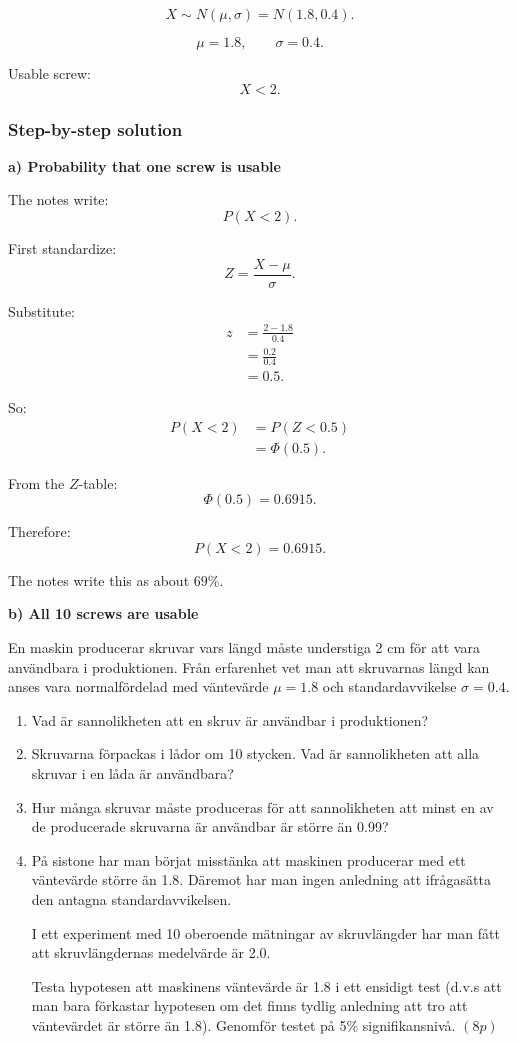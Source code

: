 \documentclass[10pt]{article}
\begin{document}
\[
X\sim N(\mu,\sigma)
=N(1.8,0.4).
\]

\[
\mu=1.8,
\qquad
\sigma=0.4.
\]

Usable screw:
\[
X<2.
\]

\subsubsection*{Step-by-step solution}

\textbf{a) Probability that one screw is usable}

The notes write:
\[
P(X<2).
\]

First standardize:
\[
Z=\frac{X-\mu}{\sigma}.
\]

Substitute:
\begin{align*}
z
&=
\frac{2-1.8}{0.4}
\\[2mm]
&=
\frac{0.2}{0.4}
\\[2mm]
&=0.5.
\end{align*}

So:
\begin{align*}
P(X<2)
&=
P(Z<0.5)
\\[2mm]
&=
\Phi(0.5).
\end{align*}

From the \(Z\)-table:
\[
\Phi(0.5)=0.6915.
\]

Therefore:
\[
P(X<2)=0.6915.
\]

The notes write this as about \(69\%\).

\textbf{b) All 10 screws are usable}

En maskin producerar skruvar vars längd måste
understiga 2 cm för att vara användbara i
produktionen. Från erfarenhet vet man att skruvarnas
längd kan anses vara normalfördelad med väntevärde
\(\mu=1.8\) och standardavvikelse \(\sigma=0.4\).

\begin{enumerate}[label=\alph*)]
\item Vad är sannolikheten att en skruv är användbar
i produktionen?

\item Skruvarna förpackas i lådor om 10 stycken.
Vad är sannolikheten att alla skruvar i en låda är
användbara?

\item Hur många skruvar måste produceras för att
sannolikheten att minst en av de producerade
skruvarna är användbar är större än 0.99?

\item På sistone har man börjat misstänka att
maskinen producerar med ett väntevärde större än
1.8. Däremot har man ingen anledning att ifrågasätta
den antagna standardavvikelsen.

I ett experiment med 10 oberoende mätningar av
skruvlängder har man fått att skruvlängdernas
medelvärde är 2.0.

Testa hypotesen att maskinens väntevärde är 1.8 i
ett ensidigt test (d.v.s att man bara förkastar
hypotesen om det finns tydlig anledning att tro att
väntevärdet är större än 1.8). Genomför testet på
5\% signifikansnivå. \((8p)\)
\end{enumerate}
\end{document}
